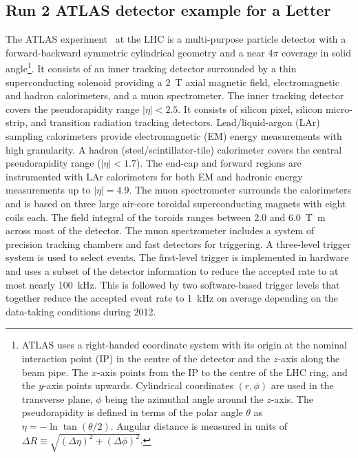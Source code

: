 \newcommand{\AtlasCoordFootnote}{%
ATLAS uses a right-handed coordinate system with its origin at the nominal interaction point (IP)
in the centre of the detector and the \(z\)-axis along the beam pipe.
The \(x\)-axis points from the IP to the centre of the LHC ring,
and the \(y\)-axis points upwards.
Cylindrical coordinates \((r,\phi)\) are used in the transverse plane, 
\(\phi\) being the azimuthal angle around the \(z\)-axis.
The pseudorapidity is defined in terms of the polar angle \(\theta\) as \(\eta = -\ln \tan(\theta/2)\).
Angular distance is measured in units of \(\Delta R \equiv \sqrt{(\Delta\eta)^{2} + (\Delta\phi)^{2}}\).}

\subsection{Run 2 ATLAS detector example for a Letter}
\label{sec:atlas1}

The ATLAS experiment~\cite{PERF-2007-01} at the LHC is a multi-purpose particle detector
with a forward-backward symmetric cylindrical geometry and a near \(4\pi\) coverage in 
solid angle\footnote{\AtlasCoordFootnote}.
It consists of an inner tracking detector surrounded by a thin superconducting solenoid
providing a \SI{2}{\tesla} axial magnetic field, electromagnetic and hadron calorimeters, and a muon spectrometer.
The inner tracking detector covers the pseudorapidity range \(|\eta| < 2.5\).
It consists of silicon pixel, silicon micro-strip, and transition radiation tracking detectors.
Lead/liquid-argon (LAr) sampling calorimeters provide electromagnetic (EM) energy measurements
with high granularity.
A hadron (steel/scintillator-tile) calorimeter covers the central pseudorapidity range (\(|\eta| < 1.7\)).
The end-cap and forward regions are instrumented with LAr calorimeters
for both EM and hadronic energy measurements up to \(|\eta| = 4.9\).
The muon spectrometer surrounds the calorimeters and is based on
three large air-core toroidal superconducting magnets with eight coils each.
The field integral of the toroids ranges between \num{2.0} and \SI{6.0}{\tesla\metre}
across most of the detector. 
The muon spectrometer includes a system of precision tracking chambers and fast detectors for triggering.
A three-level trigger system is used to select events.
The first-level trigger is implemented in hardware and uses a subset of the detector information
to reduce the accepted rate to at most nearly \SI{100}{\kHz}.
This is followed by two software-based trigger levels that
together reduce the accepted event rate to \SI{1}{\kHz} on average
depending on the data-taking conditions during 2012.


